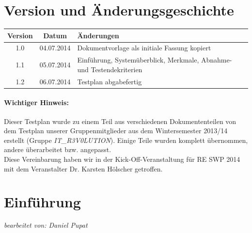 \documentclass[fontsize=12pt,paper=a4,twoside]{scrartcl}
\begin{document}


\newpage

  \thispagestyle{fancy}
  \fancyhead{}
  \fancyfoot{}
  \renewcommand{\headrulewidth}{0.4pt}
  \tableofcontents

\newpage



\section*{Version und Änderungsgeschichte}

\begin{tabular}{ccl}
Version & Datum & Änderungen \\
\hline
1.0 & 04.07.2014 & Dokumentvorlage als initiale Fassung kopiert \\
1.1 & 05.07.2014 & Einführung, Systemüberblick, Merkmale, Abnahme- und Testendekriterien\\
1.2 & 06.07.2014 & Testplan abgabefertig
\end{tabular}

\paragraph{Wichtiger Hinweis:} Dieser Testplan wurde zu einem Teil aus verschiedenen Dokumententeilen von dem Testplan unserer Gruppenmitglieder aus dem Wintersemester 2013/14 erstellt (Gruppe \textit{IT\_R3V0LUTION}). Einige Teile wurden komplett übernommen, andere überarbeitet bzw. angepasst. \\
Diese Vereinbarung haben wir in der Kick-Off-Veranstaltung für RE SWP 2014 mit dem Veranstalter Dr. Karsten Hölscher getroffen. \\

\section{Einführung}\label{c01}
\textit{bearbeitet von: Daniel Pupat }
\end{document}
